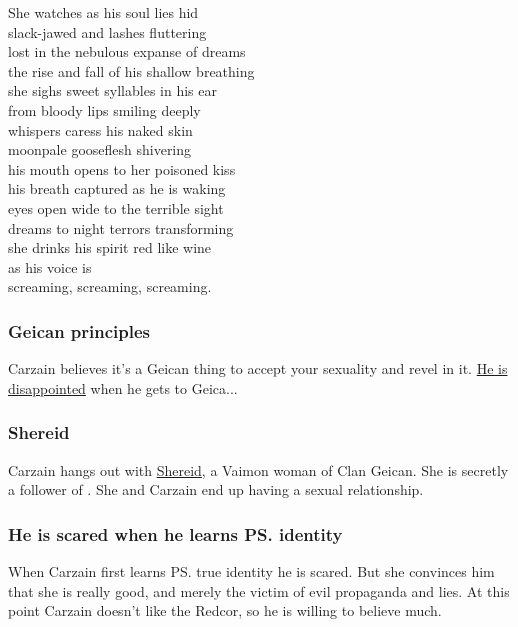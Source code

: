 \begin{garbage}
{  She watches as his soul lies hid \\
  slack-jawed and lashes fluttering \\
  lost in the nebulous expanse of dreams \\
  the rise and fall of his shallow breathing \\
  she sighs sweet syllables in his ear \\
  from bloody lips smiling deeply \\
  whispers caress his naked skin \\
  moonpale gooseflesh shivering \\
  his mouth opens to her poisoned kiss \\
  his breath captured as he is waking \\
  eyes open wide to the terrible sight \\
  dreams to night terrors transforming \\
  she drinks his spirit red like wine \\
  as his voice is \\
  screaming, screaming, screaming.
}





\subsubsection{Geican principles}
Carzain believes it's a Geican thing to accept your sexuality and revel in it. 
\hyperref[Carzain is disappointed in Geica]{He is disappointed} when he gets to Geica...





\subsubsection{Shereid}
Carzain hangs out with \hyperref[Shereid]{Shereid}, a Vaimon woman of Clan Geican. She is secretly a follower of \Belzir. She and Carzain end up having a sexual relationship.  





\subsubsection{He is scared when he learns \ps{\Belzir}{} identity}
When Carzain first learns \ps{\Belzir}{} true identity he is scared. 
But she convinces him that she is really good, and merely the victim of evil propaganda and lies. 
At this point Carzain doesn't like the Redcor, so he is willing to believe much. 






\end{garbage}
